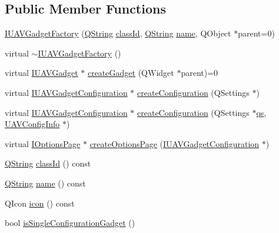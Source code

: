 \subsection*{Public Member Functions}
\begin{DoxyCompactItemize}
\item 
\hyperlink{group___core_plugin_gab8877ea5e27cd09cf547036e6a13f067}{I\-U\-A\-V\-Gadget\-Factory} (\hyperlink{group___u_a_v_objects_plugin_gab9d252f49c333c94a72f97ce3105a32d}{Q\-String} \hyperlink{group___core_plugin_gae2a481c6b01740fcec50deb4742b5173}{class\-Id}, \hyperlink{group___u_a_v_objects_plugin_gab9d252f49c333c94a72f97ce3105a32d}{Q\-String} \hyperlink{glext_8h_ad977737dfc9a274a62741b9500c49a32}{name}, Q\-Object $\ast$parent=0)
\item 
virtual \hyperlink{group___core_plugin_ga225d48c074de84253a05eac20285115b}{$\sim$\-I\-U\-A\-V\-Gadget\-Factory} ()
\item 
virtual \hyperlink{class_core_1_1_i_u_a_v_gadget}{I\-U\-A\-V\-Gadget} $\ast$ \hyperlink{group___core_plugin_ga72d6fe5bbef9f4fa2333028c7a324f66}{create\-Gadget} (Q\-Widget $\ast$parent)=0
\item 
virtual \hyperlink{class_core_1_1_i_u_a_v_gadget_configuration}{I\-U\-A\-V\-Gadget\-Configuration} $\ast$ \hyperlink{group___core_plugin_gae26104d7db90a65069c2bb654ecd5026}{create\-Configuration} (Q\-Settings $\ast$)
\item 
virtual \hyperlink{class_core_1_1_i_u_a_v_gadget_configuration}{I\-U\-A\-V\-Gadget\-Configuration} $\ast$ \hyperlink{group___core_plugin_ga7b0172f2518aaf1b32b6168d5f9b2ca2}{create\-Configuration} (Q\-Settings $\ast$\hyperlink{analyze_i_n_s_g_p_s_8m_a620a138c8981e0536c569d7761df4548}{qs}, \hyperlink{class_core_1_1_u_a_v_config_info}{U\-A\-V\-Config\-Info} $\ast$)
\item 
virtual \hyperlink{class_core_1_1_i_options_page}{I\-Options\-Page} $\ast$ \hyperlink{group___core_plugin_gaf11d34909f72b86882937f7a946ad0da}{create\-Options\-Page} (\hyperlink{class_core_1_1_i_u_a_v_gadget_configuration}{I\-U\-A\-V\-Gadget\-Configuration} $\ast$)
\item 
\hyperlink{group___u_a_v_objects_plugin_gab9d252f49c333c94a72f97ce3105a32d}{Q\-String} \hyperlink{group___core_plugin_gae2a481c6b01740fcec50deb4742b5173}{class\-Id} () const 
\item 
\hyperlink{group___u_a_v_objects_plugin_gab9d252f49c333c94a72f97ce3105a32d}{Q\-String} \hyperlink{group___core_plugin_gaa2896d7403261082943a2ff0246d6a88}{name} () const 
\item 
Q\-Icon \hyperlink{group___core_plugin_ga7db897c61f93d0d66f80236e4433d9f7}{icon} () const 
\item 
bool \hyperlink{group___core_plugin_gaa810e4d9774fc3183b3c7ee5d8a89e33}{is\-Single\-Configuration\-Gadget} ()
\end{DoxyCompactItemize}

